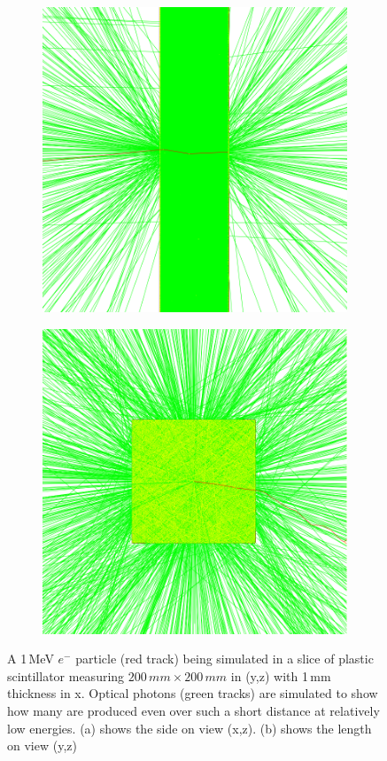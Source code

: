 \begin{figure}[!h]
\centering
\begin{subfigure}{.5\textwidth}
  \centering
  \includegraphics[width=0.7\linewidth]{Chapter4/Figs/Raster/lengthOnViewSliceElectron780Square.png}
  \captionsetup{width=.9\linewidth}
  \caption{}
  \label{subFig:lengthOnViewSliceElectron780Square}
\end{subfigure}%
\begin{subfigure}{.5\textwidth}
  \centering
  \includegraphics[width=0.7\linewidth]{Chapter4/Figs/Raster/sideOnViewSliceElectron780Square.png}
  \captionsetup{width=.9\linewidth}
  \caption{}
  \label{subFig:sideOnViewSliceElectron780Square}
\end{subfigure}
\caption{A 1\,MeV $e^-$ particle (red track) being simulated in a slice of plastic scintillator measuring $200\,mm \times 200\,mm$ in (y,z) with 1\,mm thickness in x. Optical photons (green tracks) are simulated to show how many are produced even over such a short distance at relatively low energies. (a) shows the side on view (x,z). (b) shows the length on view (y,z)}
\label{fig:lengthAndSideViewSliceElectron780Square}
\end{figure}

